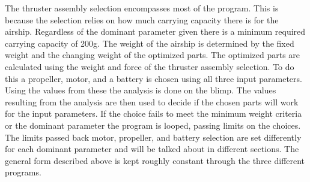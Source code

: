\documentclass[../main.tex]{subfiles}
\begin{document}
The thruster assembly selection encompasses most of the program. This is because the selection relies on how much carrying capacity there is for the airship. Regardless of the dominant parameter given there is a minimum required carrying capacity of 200g. The weight of the airship is determined by the fixed weight and the changing weight of the optimized parts. The optimized parts are calculated using the weight and force of the thruster assembly selection. To do this a propeller, motor, and a battery is chosen using all three input parameters. Using the values from these the analysis is done on the blimp. The values resulting from the analysis are then used to decide if the chosen parts will work for the input parameters. If the choice fails to meet the minimum weight criteria or the dominant parameter the program is looped, passing limits on the choices. The limits passed back motor, propeller, and battery selection are set differently for each dominant parameter and will be talked about in different sections. The general form described above is kept roughly constant through the three different programs.
\end{document}
